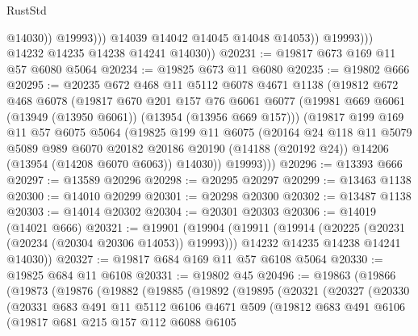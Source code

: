 \begin{lexlean}{RustStd}
\begin{coremodule}
                            @14030))
                        @19993)))
                  @14039
                  @14042
                  @14045
                  @14048
                  @14053))
              @19993)))
        @14232
        @14235
        @14238
        @14241
        @14030))
@20231 := @19817 @673 @169 @11 @57 @6080 @5064
@20234 := @19825 @673 @11 @6080
@20235 := @19802 @666
@20295 := @20235
    @672
    @468
    @11
    @5112
    @6078
    @4671
    @1138
    (@19812
      @672
      @468
      @6078
      (@19817
        @670
        @201
        @157
        @76
        @6061
        @6077
        (@19981 @669 @6061 (@13949 (@13950 @6061)) (@13954 (@13956 @669 @157)))
        (@19817
          @199
          @169
          @11
          @57
          @6075
          @5064
          (@19825
            @199
            @11
            @6075
            (@20164
              @24
              @118
              @11
              @5079
              @5089
              @989
              @6070
              @20182
              @20186
              @20190
              (@14188 (@20192 @24))
              @14206
              (@13954 (@14208 @6070 @6063))
              @14030))
          @19993)))
@20296 := @13393 @666
@20297 := @13589 @20296
@20298 := @20295 @20297
@20299 := @13463 @1138
@20300 := @14010 @20299
@20301 := @20298 @20300
@20302 := @13487 @1138
@20303 := @14014 @20302
@20304 := @20301 @20303
@20306 := @14019 (@14021 @666)
@20321 := @19901
    (@19904
      (@19911
        (@19914 (@20225 (@20231 (@20234 (@20304 @20306 @14053)) @19993)))
        @14232
        @14235
        @14238
        @14241
        @14030))
@20327 := @19817 @684 @169 @11 @57 @6108 @5064
@20330 := @19825 @684 @11 @6108
@20331 := @19802 @45
@20496 := @19863
    (@19866
      (@19873
        (@19876
          (@19882
            (@19885
              (@19892
                (@19895
                  (@20321
                    (@20327
                      (@20330
                        (@20331
                          @683
                          @491
                          @11
                          @5112
                          @6106
                          @4671
                          @509
                          (@19812
                            @683
                            @491
                            @6106
                            (@19817
                              @681
                              @215
                              @157
                              @112
                              @6088
                              @6105

\end{coremodule}
\end{lexlean}
